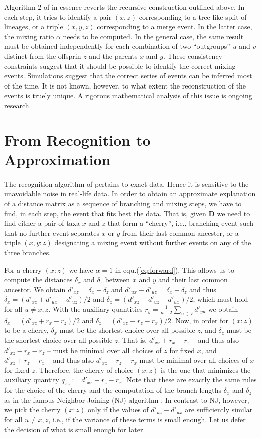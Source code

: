 \documentclass[amsmath]{lni}
\begin{document}
Algorithm 2 of \cite{Prohaska:18a} in essence reverts the recursive
construction outlined above. In each step, it tries to identify a pair
$(x,z)$ corresponding to a tree-like split of lineages, or a triple
$(x,y,z)$ corresponding to a merge event. In the latter case, the mixing
ratio $\alpha$ needs to be computed. In the general case, the same result
must be obtained independently for each combination of two ``outgroups''
$u$ and $v$ distinct from the offsprin $z$ and the parents $x$ and
$y$. These consistency constraints suggest that it should be possible to
identify the correct mixing events. Simulations \cite{Prohaska:18a} suggest
that the correct series of events can be inferred most of the time. It is
not known, however, to what extent the reconstruction of the events is
truely unique. A rigorous mathematical analysis of this issue is ongoing
research.

\section{From Recognition to Approximation} 

The recognition algorithm of \cite{Prohaska:18a} pertains to exact
data. Hence it is sensitive to the unavoidable noise in real-life data.  In
order to obtain an approximate explanation of a distance matrix as a
sequence of branching and mixing steps, we have to find, in each step, the
event that fits best the data. That is, given $\textbf{D}$ we need to find
either a pair of taxa $x$ and $z$ that form a ``cherry'', i.e., branching
event such that no further event separates $x$ or $y$ from their last
common ancester, or a triple $(x,y:z)$ designating a mixing event without
further events on any of the three branches. 

For a cherry $(x:z)$ we have $\alpha=1$ in equ.(\ref{eq:forward}). This
allows us to compute the distances $\delta_x$ and $\delta_z$ between $x$
and $y$ and their last common ancestor. We obtain
$d'_{xz}=\delta_x+\delta_z$ and $d'_{ux}-d'_{uz}=\delta_x-\delta_z$ and
thus $\delta_x=(d'_{xz}+d'_{ux}-d'_{uz})/2$ and
$\delta_z=(d'_{xz}+d'_{uz}-d'_{ux})/2$, which must hold for all $u\ne x,z$.
With the auxiliary quantities $r_y=\frac{1}{n-2}\sum_{u\in V} d'_{yu}$ we
obtain $\delta_x=(d'_{xz}+r_x-r_z)/2$ and
$\delta_z=(d'_{xz}+r_z-r_x)/2$. Now, in order for $(x:z)$ to be a cherry,
$\delta_x$ must be the shortest choice over all possible $z$, and
$\delta_z$ must be the shortest choice over all possible $z$. That is,
$d'_{xz}+r_x-r_z$ -- and thus also $d'_{xz}-r_x-r_z$ -- must be minimal
over all choices of $z$ for fixed $x$, and $d'_{xz}+r_z-r_x$ -- and thus
also $d'_{xz}-r_z-r_x$ must be minimal over all choices of $x$ for fixed
$z$. Therefore, the cherry of choice $(x:z)$ is the one that minimizes the
auxiliary quantity $q_{xz}:= d'_{xz}-r_z-r_x$. Note that these are exactly
the same rules for the choice of the cherry and the computation of the
branch lengths $\delta_x$ and $\delta_z$ as in the famous Neighbor-Joining
(NJ) algorithm \cite{Saitou:87}. In contrast to NJ, however, we pick the
cherry $(x:z)$ only if the values of $d'_{uz}-d'_{ux}$ are sufficiently
similar for all $u\ne x,z$, i.e., if the variance of these terms is small
enough. Let us defer the decision of what is small enough for later.
\end{document}
